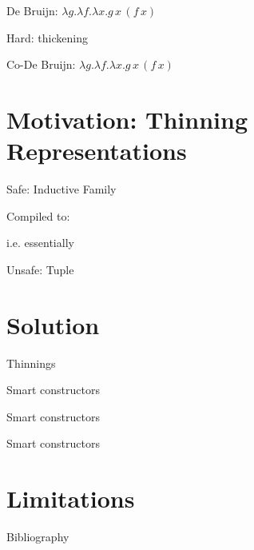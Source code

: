 \documentclass{beamer}
\begin{document}
\begin{frame}{De Bruijn: $\lambda{}g.\lambda{}f.\lambda{}x.g\,x\,(f\,x)$}


\vfill
Hard: thickening
\end{frame}

\begin{frame}{Co-De Bruijn: $\lambda{}g.\lambda{}f.\lambda{}x.g\,x\,(f\,x)$}

\end{frame}

\section{Motivation: Thinning Representations}

\begin{frame}{Safe: Inductive Family}

\vfill

Compiled to:


i.e. essentially  
\end{frame}

\begin{frame}{Unsafe: Tuple}
\end{frame}

\section{Solution}

\begin{frame}{Thinnings}


\end{frame}

\begin{frame}{Smart constructors}


\end{frame}

\begin{frame}{Smart constructors}

\end{frame}

\begin{frame}{Smart constructors}

\end{frame}


\section{Limitations}



\begin{frame}{Bibliography}

\end{frame}
\end{document}

